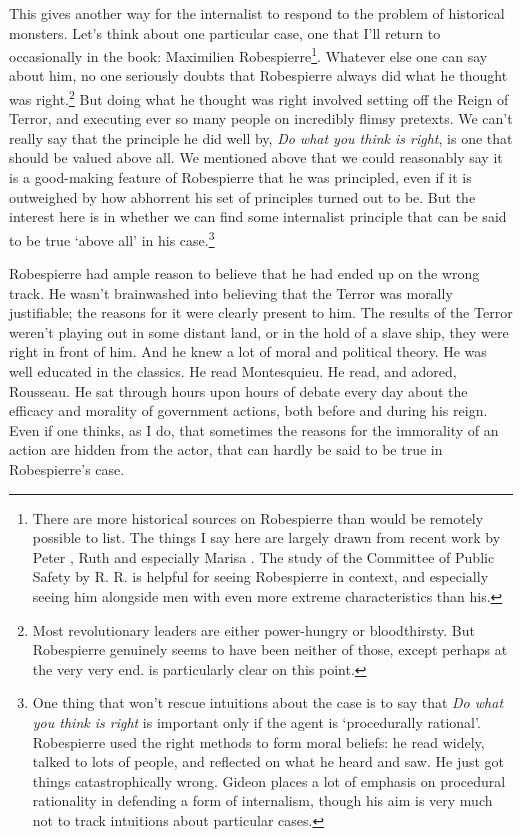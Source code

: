 This gives another way for the internalist to respond to the problem of historical monsters. Let's think about one particular case, one that I'll return to occasionally in the book: Maximilien \gls{Robespierre}\footnote{There are more historical sources on \gls{Robespierre} than would be remotely possible to list. The things I say here are largely drawn from recent work by Peter \citet{McPhee2012}, Ruth \citet{Scurr2006} and especially Marisa \citet{Linton2013}. The study of the Committee of Public Safety by R. R. \citet{Palmer1941} is helpful for seeing \gls{Robespierre} in context, and especially seeing him alongside men with even more extreme characteristics than his.}. Whatever else one can say about him, no one seriously doubts that \gls{Robespierre} always did what he thought was right.\footnote{Most revolutionary leaders are either power-hungry or bloodthirsty. But \gls{Robespierre} genuinely seems to have been neither of those, except perhaps at the very very end. \citet[97-99]{Linton2013} is particularly clear on this point.} But doing what he thought was right involved setting off the Reign of Terror, and executing ever so many people on incredibly flimsy pretexts. We can't really say that the principle he did well by, \emph{Do what you think is right}, is one that should be valued above all. We mentioned above that we could reasonably say it is a good-making feature of \gls{Robespierre} that he was principled, even if it is outweighed by how abhorrent his set of principles turned out to be. But the interest here is in whether we can find some internalist principle that can be said to be true `above all' in his case.\footnote{One thing that won't rescue intuitions about the case is to say that \emph{Do what you think is right} is important only if the agent is `procedurally rational'. \gls{Robespierre} used the right methods to form moral beliefs: he read widely, talked to lots of people, and reflected on what he heard and saw. He just got things catastrophically wrong. Gideon \citet{Rosen2003, Rosen2004} places a lot of emphasis on procedural rationality in defending a form of internalism, though his aim is very much not to track intuitions about particular cases.}

\gls{Robespierre} had ample reason to believe that he had ended up on the wrong track. He wasn't brainwashed into believing that the Terror was morally justifiable; the reasons for it were clearly present to him. The results of the Terror weren't playing out in some distant land, or in the hold of a slave ship, they were right in front of him. And he knew a lot of moral and political theory. He was well educated in the classics. He read Montesquieu. He read, and adored, Rousseau. He sat through hours upon hours of debate every day about the efficacy and morality of government actions, both before and during his reign. Even if one thinks, as I do, that sometimes the reasons for the immorality of an action are hidden from the actor, that can hardly be said to be true in \gls{Robespierre}'s case.

